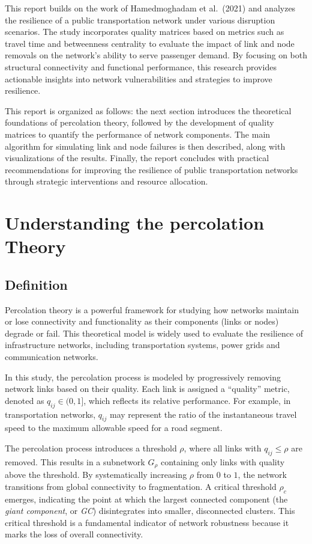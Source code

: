 \documentclass[
  letterpaper,
  DIV=11,
  numbers=noendperiod]{scrartcl}
\begin{document}
This report builds on the work of Hamedmoghadam et al.~(2021) and
analyzes the resilience of a public transportation network under various
disruption scenarios. The study incorporates quality matrices based on
metrics such as travel time and betweenness centrality to evaluate the
impact of link and node removals on the network's ability to serve
passenger demand. By focusing on both structural connectivity and
functional performance, this research provides actionable insights into
network vulnerabilities and strategies to improve resilience.

This report is organized as follows: the next section introduces the
theoretical foundations of percolation theory, followed by the
development of quality matrices to quantify the performance of network
components. The main algorithm for simulating link and node failures is
then described, along with visualizations of the results. Finally, the
report concludes with practical recommendations for improving the
resilience of public transportation networks through strategic
interventions and resource allocation.

\section{Understanding the percolation
Theory}\label{understanding-the-percolation-theory}

\subsection{Definition}\label{definition}

Percolation theory is a powerful framework for studying how networks
maintain or lose connectivity and functionality as their components
(links or nodes) degrade or fail. This theoretical model is widely used
to evaluate the resilience of infrastructure networks, including
transportation systems, power grids and communication networks.

In this study, the percolation process is modeled by progressively
removing network links based on their quality. Each link is assigned a
``quality'' metric, denoted as \(q_{ij} \in (0,1]\), which reflects its
relative performance. For example, in transportation networks,
\(q_{ij}\) may represent the ratio of the instantaneous travel speed to
the maximum allowable speed for a road segment.

The percolation process introduces a threshold \(\rho\), where all links
with \(q_{ij} \leq \rho\) are removed. This results in a subnetwork
\(G_\rho\) containing only links with quality above the threshold. By
systematically increasing \(\rho\) from \(0\) to \(1\), the network
transitions from global connectivity to fragmentation. A critical
threshold \(\rho_c\) emerges, indicating the point at which the largest
connected component (the \emph{giant component}, or \emph{GC})
disintegrates into smaller, disconnected clusters. This critical
threshold is a fundamental indicator of network robustness because it
marks the loss of overall connectivity.
\end{document}
